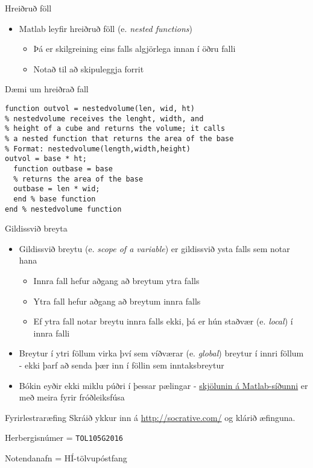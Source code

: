 \documentclass{beamer}
\begin{document}
\begin{frame}{Hreiðruð föll}
\begin{itemize}
 \item Matlab leyfir hreiðruð föll (e. \emph{nested functions})
 \begin{itemize}
  \item Þá er skilgreining eins falls algjörlega innan í öðru falli
  \item Notað til að skipuleggja forrit
 \end{itemize}
\end{itemize}
\end{frame}

\begin{frame}[fragile]{Dæmi um hreiðrað fall}
\begin{verbatim}
function outvol = nestedvolume(len, wid, ht)
% nestedvolume receives the lenght, width, and
% height of a cube and returns the volume; it calls
% a nested function that returns the area of the base
% Format: nestedvolume(length,width,height)
outvol = base * ht;
  function outbase = base
  % returns the area of the base
  outbase = len * wid;
  end % base function
end % nestedvolume function
\end{verbatim}

\end{frame}


\begin{frame}{Gildissvið breyta}
\vspace{\baselineskip}
\begin{itemize}
 \item Gildissvið breytu (e. \emph{scope of a variable}) er gildissvið ysta falls sem notar hana
 \begin{itemize}
  \item Innra fall hefur aðgang að breytum ytra falls
  \item Ytra fall hefur aðgang að breytum innra falls
  \item Ef ytra fall notar breytu innra falls ekki, þá er hún staðvær (e. \emph{local}) í innra falli
 \end{itemize}
 \item Breytur í ytri föllum virka því sem víðværar (e. \emph{global}) breytur í innri föllum - ekki þarf að senda þær inn í föllin sem inntaksbreytur
 \item Bókin eyðir ekki miklu púðri í þessar pælingar - \href{http://se.mathworks.com/help/matlab/matlab_prog/nested-functions.html?refresh=true}{skjölunin á Matlab-síðunni} er með meira fyrir fróðleiksfúsa
\end{itemize}
\end{frame}

\begin{frame}[fragile]{Fyrirlestraræfing}
Skráið ykkur inn á \url{http://socrative.com/} og klárið æfinguna.

Herbergisnúmer = \texttt{TOL105G2016}

Notendanafn = HÍ-tölvupóstfang
\end{frame}
\end{document}
